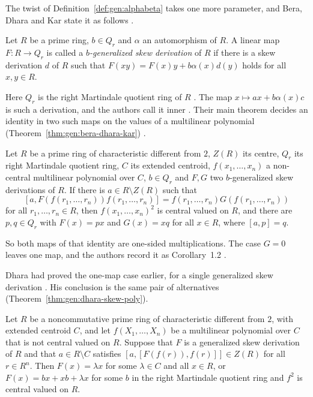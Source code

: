 The twist of Definition~\ref{def:gen:alphabeta} takes one more parameter, and
Bera, Dhara and Kar state it as follows \cite[p.~888]{BeraDharaKar2023}.

\begin{definition}\label{def:gen:b-generalized-skew}
Let $R$ be a prime ring, $b\in Q_{r}$ and $\alpha$ an automorphism of $R$. A
linear map $F\colon R\to Q_{r}$ is called a \emph{$b$-generalized skew
derivation} of $R$ if there is a skew derivation $d$ of $R$ such that
$F(xy)=F(x)y+b\alpha(x)d(y)$ holds for all $x,y\in R$.
\end{definition}

Here $Q_{r}$ is the right Martindale quotient ring of $R$
\cite[p.~888]{BeraDharaKar2023}. The map $x\mapsto ax+b\alpha(x)c$ is such a
derivation, and the authors call it inner \cite[p.~888]{BeraDharaKar2023}.
Their main theorem decides an identity in two such maps on the values of a
multilinear polynomial (Theorem~\ref{thm:gen:bera-dhara-kar}) \cite[Theorem~1.1, p.~889]{BeraDharaKar2023}.

\begin{theorem}\label{thm:gen:bera-dhara-kar}
Let $R$ be a prime ring of characteristic different from $2$, $Z(R)$ its centre,
$Q_{r}$ its right Martindale quotient ring, $C$ its extended centroid,
$f(x_{1},\dots,x_{n})$ a non-central multilinear polynomial over $C$, $b\in Q_{r}$
and $F,G$ two $b$-generalized skew derivations of $R$. If there is
$a\in R\setminus Z(R)$ such that
\[
[a,F(f(r_{1},\dots,r_{n}))f(r_{1},\dots,r_{n})]
=f(r_{1},\dots,r_{n})G\left(f(r_{1},\dots,r_{n})\right)
\]
for all $r_{1},\dots,r_{n}\in R$, then $f(x_{1},\dots,x_{n})^{2}$ is central
valued on $R$, and there are $p,q\in Q_{r}$ with $F(x)=px$ and $G(x)=xq$ for all
$x\in R$, where $[a,p]=q$.
\end{theorem}

So both maps of that identity are one-sided multiplications. The case $G=0$
leaves one map, and the authors record it as Corollary~1.2
\cite[Corollary~1.2, p.~889]{BeraDharaKar2023}.

Dhara had proved the one-map case earlier, for a single generalized skew
derivation \cite[p.~1]{Dhara2019Quaest}. His conclusion is the same pair of
alternatives (Theorem~\ref{thm:gen:dhara-skew-poly}).

\begin{theorem}\label{thm:gen:dhara-skew-poly}
Let $R$ be a noncommutative prime ring of characteristic different from $2$, with
extended centroid $C$, and let $f(X_{1},\dots,X_{n})$ be a multilinear polynomial
over $C$ that is not central valued on $R$. Suppose that $F$ is a generalized skew
derivation of $R$ and that $a\in R\setminus C$ satisfies
$[a,[F(f(r)),f(r)]]\in Z(R)$ for all $r\in R^{n}$. Then $F(x)=\lambda x$ for some
$\lambda\in C$ and all $x\in R$, or $F(x)=bx+xb+\lambda x$ for some $b$ in the right
Martindale quotient ring and $f^{2}$ is central valued on $R$.
\end{theorem}

